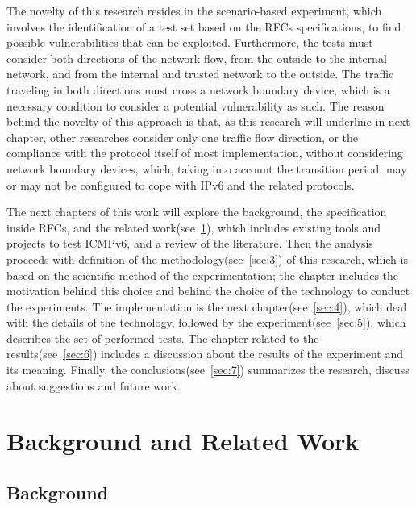 \documentclass[12pt]{article}
\begin{document}
The novelty of this research resides in the scenario-based experiment, which involves the identification of a test set based on the RFCs specifications, to find possible vulnerabilities that can be exploited. Furthermore, the tests must consider both directions of the network flow, from the outside to the internal network, and from the internal and trusted network to the outside. The traffic traveling in both directions must cross a network boundary device, which is a necessary condition to consider a potential vulnerability as such. The reason behind the novelty of this approach is that, as this research will underline in next chapter, other researches consider only one traffic flow direction, or the compliance with the protocol itself of most implementation, without considering network boundary devices, which, taking into account the transition period, may or may not be configured to cope with IPv6 and the related protocols.

The next chapters of this work will explore the background, the specification inside RFCs, and the related work(see~\ref{sec:2}), which includes existing tools and projects to test ICMPv6, and a review of the literature. Then the analysis proceeds with definition of the methodology(see~\ref{sec:3}) of this research, which is based on the scientific method of the experimentation; the chapter includes the motivation behind this choice and behind the choice of the technology to conduct the experiments. The implementation is the next chapter(see~\ref{sec:4}), which deal with the details of the technology, followed by the experiment(see~\ref{sec:5}), which describes the set of performed tests. The chapter related to the results(see~\ref{sec:6}) includes a discussion about the results of the experiment and its meaning. Finally, the conclusions(see~\ref{sec:7}) summarizes the research, discuss about suggestions and future work.

 

\pagebreak
\section{Background and Related Work}
\label{sec:2}


\subsection{Background}
\label{sub:background}
\end{document}
